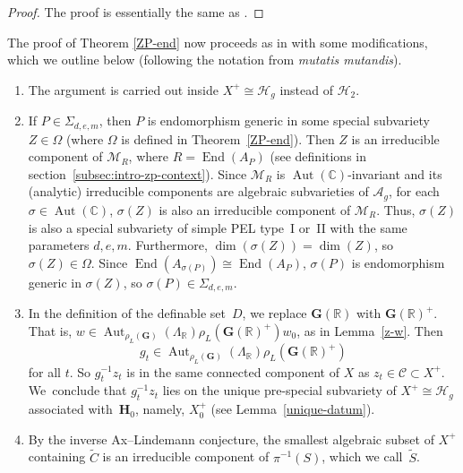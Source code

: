 \documentclass[JEP,XML,SOM,Unicode,NoFloatCountersInSection]{cedram}
\newcommand{\bC}{\mathbb{C}}
\newcommand{\bR}{\mathbb{R}}
\newcommand{\cC}{\mathcal{C}}
\newcommand{\cH}{\mathcal{H}}
\newcommand{\cM}{\mathcal{M}}
\newcommand{\Ag}{\mathcal{A}_g}
\newcommand{\Hg}{\mathcal{H}_g}
\newcommand{\gG}{\mathbf{G}}
\newcommand{\gH}{\mathbf{H}}
\DeclareMathOperator{\Aut}{Aut}
\DeclareMathOperator{\End}{End}
\begin{document}
\begin{proof}
The proof is essentially the same as \cite[Cor.\,6.4]{QRTUI}.
\end{proof}

The proof of Theorem \ref{ZP-end} now proceeds as in
\cite[\S6.5]{QRTUI} with some modifications, which we outline below (following the notation from \cite[\S6.5]{QRTUI} \textit{mutatis mutandis}).
\begin{enumerate}
\item The argument is carried out inside $X^+ \cong \Hg$ instead of $\cH_2$.

\item If $P \in \Sigma_{d,e,m}$, then $P$ is endomorphism generic in some special subvariety $Z \in \Omega$ (where $\Omega$ is defined in Theorem~\ref{ZP-end}).
Then $Z$ is an irreducible component of $\cM_R$, where $R = \End(A_P)$ (see definitions in section~\ref{subsec:intro-zp-context}).
Since $\cM_R$ is $\Aut(\bC)$-invariant and its (analytic) irreducible components are algebraic subvarieties of $\Ag$, for each $\sigma \in \Aut(\bC)$, $\sigma(Z)$ is also an irreducible component of $\cM_R$.
Thus, $\sigma(Z)$ is also a special subvariety of simple PEL type~I or~II with the same parameters $d,e,m$.
Furthermore, $\dim(\sigma(Z)) = \dim(Z)$, so $\sigma(Z) \in \Omega$.
Since $\End(A_{\sigma(P)}) \cong \End(A_P)$, $\sigma(P)$ is endomorphism generic in $\sigma(Z)$, so $\sigma(P) \in \Sigma_{d,e,m}$.

\item In the definition of the definable set~$D$, we replace $\gG(\bR)$ with $\gG(\bR)^+$. That is, $w\in\Aut_{\rho_L(\gG)}(\Lambda_\bR)\rho_L(\gG(\bR)^+)w_0$, as in Lemma~\ref{z-w}. Then
\[g_t \in \Aut_{\rho_L(\gG)}(\Lambda_\bR) \rho_L(\gG(\bR)^+)\] for all $t$. So $g_t^{-1}z_t$ is in the same connected component of $X$ as $z_t \in \cC \subset X^+$. We~conclude that $g_t^{-1}z_t$ lies on the unique pre-special subvariety of $X^+\cong\Hg$ associated with~$\gH_0$, namely, $X^+_0$ (see Lemma~\ref{unique-datum}).

\item By the inverse Ax--Lindemann conjecture, the smallest algebraic subset of $X^+$ containing $\tilde{C}$ is an irreducible component of $\pi^{-1}(S)$, which we call~$\tilde{S}$.


\end{enumerate}
\end{document}
